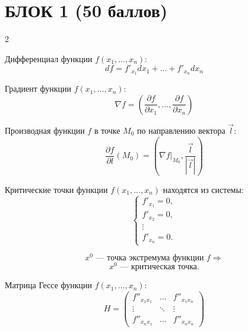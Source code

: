 \section{БЛОК 1 (50 баллов)}

\small
\setlength{\parskip}{1pt}
\setlength{\abovedisplayskip}{3pt}
\setlength{\belowdisplayskip}{3pt}
\setlength{\abovedisplayshortskip}{2pt}
\setlength{\belowdisplayshortskip}{2pt}

\begin{multicols}{2}

\begin{definition}
    Дифференциал функции $f(x_1, \ldots, x_n)$:
    \[
        df = f'_{x_1}dx_1 + \ldots + f'_{x_n}dx_n
    \]
\end{definition}

\begin{definition}
    Градиент функции $f(x_1, \ldots, x_n)$:
    \[
        \nabla f =
        \left(
            \frac{\partial f}{\partial x_1},
            \ldots,
            \frac{\partial f}{\partial x_n}
        \right)
    \]
\end{definition}

\begin{definition}
    Производная функции $f$ в точке $M_0$ по направлению вектора $\vec l$:
    \[
        \frac{\partial f}{\partial l}(M_0)
        =
        \left(
            \nabla f\big|_{M_0},
            \frac{\vec l}{|\vec l|}
        \right)
    \]
\end{definition}

\begin{definition}
    Критические точки функции $f(x_1, \ldots, x_n)$ находятся из системы:
    \[
        \begin{cases}
            f'_{x_1} = 0, \\
            f'_{x_2} = 0, \\
            \vdots \\
            f'_{x_n} = 0.
        \end{cases}
    \]
\end{definition}

\begin{theorem}
    \[
        x^0 \text{ --- точка экстремума функции } f
        \Rightarrow
    \]
    \[
        x^0 \text{ --- критическая точка.}
    \]
\end{theorem}

\begin{definition}
    Матрица Гессе функции $f(x_1, \ldots, x_n)$:
    \[
        H =
        \begin{pmatrix}
            f''_{x_1x_1} & \ldots & f''_{x_1x_n} \\
            \vdots & \ddots & \vdots \\
            f''_{x_nx_1} & \ldots & f''_{x_nx_n}
        \end{pmatrix}
    \]
\end{definition}


\end{multicols}
